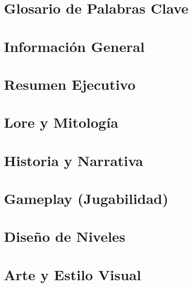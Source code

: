 \documentclass[a4paper,12pt]{article}
\begin{document}


\tableofcontents
\newpage

\section{Glosario de Palabras Clave}


\section{Información General}


\section{Resumen Ejecutivo}


\section{Lore y Mitología}




\section{Historia y Narrativa}




\section{Gameplay (Jugabilidad)}




\section{Diseño de Niveles}




\section{Arte y Estilo Visual}



\end{document}
